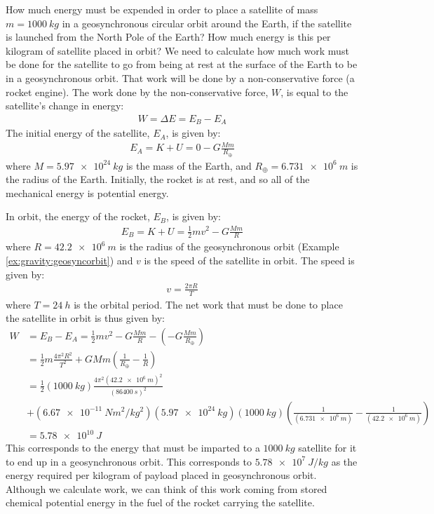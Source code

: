 \begin{example}{How much energy must be expended in order to place a satellite of mass $m=\SI{1000}{kg}$ in a geosynchronous circular orbit around the Earth, if the satellite is launched from the North Pole of the Earth? How much energy is this per kilogram of satellite placed in orbit?}
We need to calculate how much work must be done for the satellite to go from being at rest at the surface of the Earth to be in a geosynchronous orbit. That work will be done by a non-conservative force (a rocket engine). The work done by the non-conservative force, $W$, is equal to the satellite's change in energy:
\begin{align*}
W = \Delta E = E_B -E_A
\end{align*}
The initial energy of the satellite, $E_A$, is given by:
\begin{align*}
E_A = K + U = 0 - G\frac{Mm}{R_\oplus}
\end{align*}
where $M=\SI{5.97e24}{kg}$ is the mass of the Earth, and $R_\oplus=\SI{6.731e6}{m}$ is the radius of the Earth. Initially, the rocket is at rest, and so all of the mechanical energy is potential energy. 

In orbit, the energy of the rocket, $E_B$, is given by:
\begin{align*}
E_B = K + U = \frac{1}{2}mv^2 - G\frac{Mm}{R}
\end{align*}
where $R=\SI{42.2e6}{m}$ is the radius of the geosynchronous orbit (Example \ref{ex:gravity:geosyncorbit}) and $v$ is the speed of the satellite in orbit. The speed is given by:
\begin{align*}
v = \frac{2\pi R}{T}
\end{align*}
where $T=\SI{24}{h}$ is the orbital period. The net work that must be done to place the satellite in orbit is thus given by:
\begin{align*}
W &= E_B - E_A = \frac{1}{2}mv^2 - G\frac{Mm}{R} - \left(- G\frac{Mm}{R_\oplus}\right)\\
&=\frac{1}{2}m\frac{4\pi^2 R^2}{T^2}+GMm\left(\frac{1}{R_\oplus}-\frac{1}{R}\right)\\
&=\frac{1}{2}(\SI{1000}{kg})\frac{4\pi^2 (\SI{42.2e6}{m})^2}{(\SI{86400}{s})^2}\\
&+(\SI{6.67e-11}{Nm^2/kg^2})(\SI{5.97e24}{kg})(\SI{1000}{kg})\left(\frac{1}{(\SI{6.731e6}{m})}-\frac{1}{(\SI{42.2e6}{m})}\right)\\
&=\SI{5.78e10}{J}
\end{align*}
This corresponds to the energy that must be imparted to a $\SI{1000}{kg}$ satellite for it to end up in a geosynchronous orbit. This corresponds to $\SI{5.78e7}{J/kg}$ as the energy required per kilogram of payload placed in geosynchronous orbit. Although we calculate work, we can think of this work coming from stored chemical potential energy in the fuel of the rocket carrying the satellite. 


\end{example}
